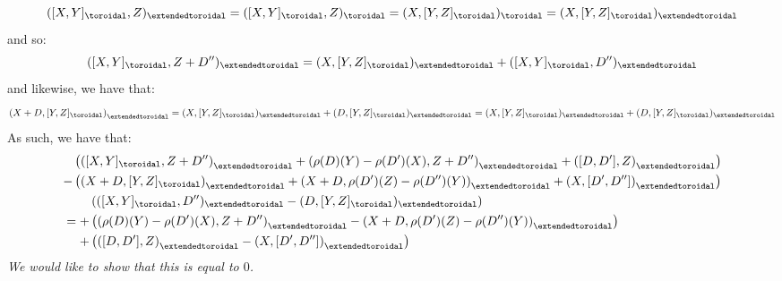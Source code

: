                     $$([X, Y]_{\toroidal}, Z)_{\extendedtoroidal} = ([X, Y]_{\toroidal}, Z)_{\toroidal} = (X, [Y, Z]_{\toroidal})_{\toroidal} = (X, [Y, Z]_{\toroidal})_{\extendedtoroidal}$$
                and so:
                    $$( [X, Y]_{\toroidal}, Z + D'' )_{\extendedtoroidal} = (X, [Y, Z]_{\toroidal})_{\extendedtoroidal} + ( [X, Y]_{\toroidal}, D'')_{\extendedtoroidal}$$
                and likewise, we have that:
                    $$\left( X + D, [Y, Z]_{\toroidal} \right)_{\extendedtoroidal} = (X, [Y, Z]_{\toroidal})_{\extendedtoroidal} + (D, [Y, Z]_{\toroidal})_{\extendedtoroidal} = (X, [Y, Z]_{\toroidal})_{\extendedtoroidal} + (D, [Y, Z]_{\toroidal})_{\extendedtoroidal}$$
                As such, we have that:
                    $$
                        \begin{aligned}
                            & 
                            \begin{aligned}
                                & \left( \left( [X, Y]_{\toroidal}, Z + D'' \right)_{\extendedtoroidal} + \left(\rho(D)(Y) - \rho(D')(X), Z + D'' \right)_{\extendedtoroidal} + \left( [D, D'], Z \right)_{\extendedtoroidal} \right)
                                \\
                                - & \left( \left( X + D, [Y, Z]_{\toroidal} \right)_{\extendedtoroidal} + \left( X + D, \rho(D')(Z) - \rho(D'')(Y) \right)_{\extendedtoroidal} + \left(X, [D', D'']\right)_{\extendedtoroidal} \right)
                            \end{aligned}
                            \\
                            & =
                            \begin{aligned}
                                & \left( ( [X, Y]_{\toroidal}, D'')_{\extendedtoroidal} - (D, [Y, Z]_{\toroidal})_{\extendedtoroidal} \right)
                                \\
                                + & \left( \left(\rho(D)(Y) - \rho(D')(X), Z + D'' \right)_{\extendedtoroidal} - \left( X + D, \rho(D')(Z) - \rho(D'')(Y) \right)_{\extendedtoroidal} \right)
                                \\
                                + & \left( \left( [D, D'], Z \right)_{\extendedtoroidal} - \left(X, [D', D'']\right)_{\extendedtoroidal} \right)
                            \end{aligned}
                        \end{aligned}
                    $$
                \textit{We would like to show that this is equal to $0$.}

